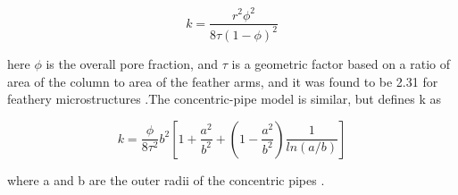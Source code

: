 \documentclass[%
 aip,
 amsmath,amssymb,
 reprint,%
]{revtex4-1}
\begin{document}
\begin{equation}
    k=\frac{r^2\phi^2}{8\tau\left(1-\phi\right)^2}
    \label{eq:oPM}
\end{equation}

\noindent here $\phi$ is the overall pore fraction, and $\tau$ is a geometric factor based on a ratio of area of the column to area of the feather arms, and it was found to be 2.31 for feathery microstructures \cite{Naraparaju2019}.The concentric-pipe model is similar, but defines k as

\begin{equation}
    k=\frac{\phi}{8\tau^2}b^2\left[1+\frac{a^2}{b^2}+\left(1-\frac{a^2}{b^2}\right)\frac{1}{ln\left(a/b\right)}\right]
    \label{eq:CPM}
\end{equation}

\noindent where a and b are the outer radii of the concentric pipes \cite{Naraparaju2019}. 

\nocite{*}
\end{document}
